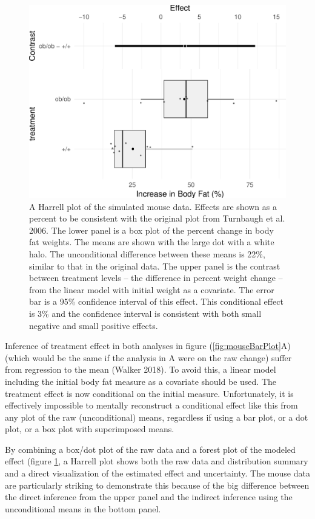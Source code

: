 \documentclass[]{article}
\theoremstyle{definition}
\theoremstyle{definition}
\theoremstyle{definition}
\theoremstyle{remark}
\begin{document}
\begin{figure}
\includegraphics{../output/mouseHarrellPlot} \caption{A Harrell plot of the simulated mouse data. Effects are shown as a percent to be consistent with the original plot from Turnbaugh et al. 2006. The lower panel is a box plot of the percent change in body fat weights. The means are shown with the large dot with a white halo. The unconditional difference between these means is 22\%, similar to that in the original data. The upper panel is the contrast between treatment levels -- the difference in percent weight change -- from the linear model with initial weight as a covariate. The error bar is a 95\% confidence interval of this effect. This conditional effect is 3\% and the confidence interval is consistent with both small negative and small positive effects.}\label{fig:mouseHarrellPlot}
\end{figure}

Inference of treatment effect in both analyses in figure
(\ref{fig:mouseBarPlot}A) (which would be the same if the analysis in A
were on the raw change) suffer from regression to the mean (Walker
2018). To avoid this, a linear model including the initial body fat
measure as a covariate should be used. The treatment effect is now
conditional on the initial measure. Unfortunately, it is effectively
impossible to mentally reconstruct a conditional effect like this from
any plot of the raw (unconditional) means, regardless if using a bar
plot, or a dot plot, or a box plot with superimposed means.

By combining a box/dot plot of the raw data and a forest plot of the
modeled effect (figure \ref{fig:mouseHarrellPlot}, a Harrell plot shows
both the raw data and distribution summary and a direct visualization of
the estimated effect and uncertainty. The mouse data are particularly
striking to demonstrate this because of the big difference between the
direct inference from the upper panel and the indirect inference using
the unconditional means in the bottom panel.
\end{document}
